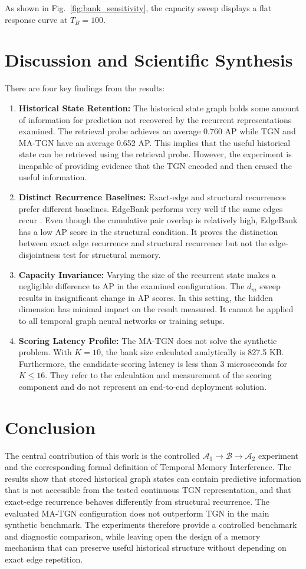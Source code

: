 \documentclass[conference]{IEEEtran}
\begin{document}
As shown in Fig.~\ref{fig:bank_sensitivity}, the capacity sweep displays a flat response curve at $T_B=100$.

\section{Discussion and Scientific Synthesis}
There are four key findings from the results:
\begin{enumerate}
    \item \textbf{Historical State Retention:} The historical state graph holds some amount of information for prediction not recovered by the recurrent representations examined. The retrieval probe achieves an average 0.760 AP while TGN and MA-TGN have an average 0.652 AP. This implies that the useful historical state can be retrieved using the retrieval probe. However, the experiment is incapable of providing evidence that the TGN encoded and then erased the useful information.
    \item \textbf{Distinct Recurrence Baselines:} Exact-edge and structural recurrences prefer different baselines. EdgeBank performs very well if the same edges recur \cite{poursafaei2022towards}. Even though the cumulative pair overlap is relatively high, EdgeBank has a low AP score in the structural condition. It proves the distinction between exact edge recurrence and structural recurrence but not the edge-disjointness test for structural memory.
    \item \textbf{Capacity Invariance:} Varying the size of the recurrent state makes a negligible difference to AP in the examined configuration. The $d_m$ sweep results in insignificant change in AP scores. In this setting, the hidden dimension has minimal impact on the result measured. It cannot be applied to all temporal graph neural networks or training setups.
    \item \textbf{Scoring Latency Profile:} The MA-TGN does not solve the synthetic problem. With $K=10$, the bank size calculated analytically is 827.5 KB. Furthermore, the candidate-scoring latency is less than 3 microseconds for $K \le 16$. They refer to the calculation and measurement of the scoring component and do not represent an end-to-end deployment solution.
\end{enumerate}

\section{Conclusion}
The central contribution of this work is the controlled $\mathcal{A}_1 \to \mathcal{B} \to \mathcal{A}_2$ experiment and the corresponding formal definition of Temporal Memory Interference. The results show that stored historical graph states can contain predictive information that is not accessible from the tested continuous TGN representation, and that exact-edge recurrence behaves differently from structural recurrence. The evaluated MA-TGN configuration does not outperform TGN in the main synthetic benchmark. The experiments therefore provide a controlled benchmark and diagnostic comparison, while leaving open the design of a memory mechanism that can preserve useful historical structure without depending on exact edge repetition.
\end{document}
